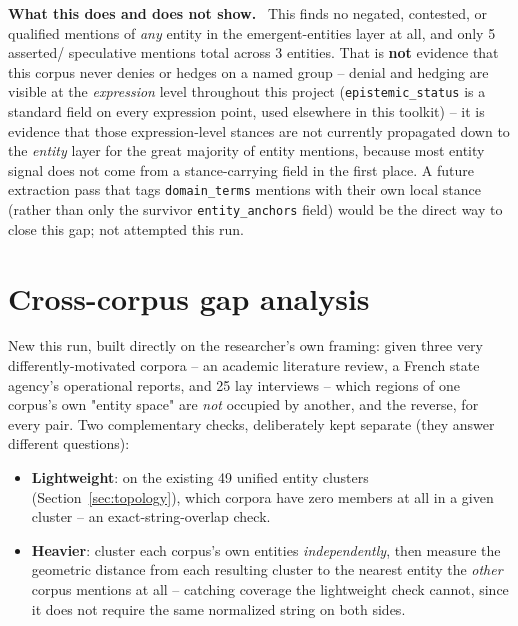 \documentclass[11pt,a4paper]{article}
\newenvironment{plainbox}[1][Note]
  {\par\vspace{6pt}\noindent{\color{noteline}\rule{\linewidth}{0.6pt}}\par\vspace{3pt}
   \noindent\small\textbf{#1.}\ \ignorespaces}
  {\par\vspace{3pt}\noindent{\color{noteline}\rule{\linewidth}{0.6pt}}\vspace{6pt}\par}
\begin{document}
\begin{plainbox}[What this does and does not show]
This finds no negated, contested, or qualified mentions of \emph{any}
entity in the emergent-entities layer at all, and only 5 asserted/
speculative mentions total across 3 entities. That is \textbf{not}
evidence that this corpus never denies or hedges on a named group --
denial and hedging are visible at the \emph{expression} level throughout
this project (\texttt{epistemic\_status} is a standard field on every
expression point, used elsewhere in this toolkit) -- it is evidence that
those expression-level stances are not currently propagated down to the
\emph{entity} layer for the great majority of entity mentions, because
most entity signal does not come from a stance-carrying field in the
first place. A future extraction pass that tags \texttt{domain\_terms}
mentions with their own local stance (rather than only the survivor
\texttt{entity\_anchors} field) would be the direct way to close this
gap; not attempted this run.
\end{plainbox}

\section{Cross-corpus gap analysis}
\label{sec:crossgaps}

New this run, built directly on the researcher's own framing: given
three very differently-motivated corpora -- an academic literature
review, a French state agency's operational reports, and 25 lay
interviews -- which regions of one corpus's own "entity space" are
\emph{not} occupied by another, and the reverse, for every pair. Two
complementary checks, deliberately kept separate (they answer different
questions):

\begin{itemize}[leftmargin=1.4em]
  \item \textbf{Lightweight}: on the existing 49 unified entity clusters
  (Section~\ref{sec:topology}), which corpora have zero members at all
  in a given cluster -- an exact-string-overlap check.
  \item \textbf{Heavier}: cluster each corpus's own entities
  \emph{independently}, then measure the geometric distance from each
  resulting cluster to the nearest entity the \emph{other} corpus
  mentions at all -- catching coverage the lightweight check cannot,
  since it does not require the same normalized string on both sides.
\end{itemize}
\end{document}

